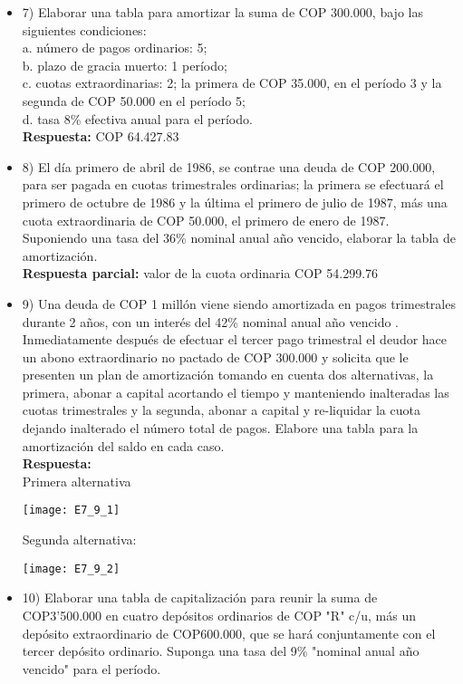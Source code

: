 \begin{itemize}
 \item 7)	Elaborar una tabla para amortizar la suma de COP 300.000, bajo las siguientes condiciones:\\
       a.	número de pagos ordinarios: 5;\\
       b.	plazo de gracia muerto: 1 período;\\
       c.	cuotas extraordinarias: 2; la primera de COP 35.000, en el período 3 y la segunda de COP 50.000 en el período 5;\\
       d.	tasa 8\% efectiva anual para el período.\\
       \textbf{Respuesta:} COP 64.427.83
       \medskip

 \item 8)	El día primero de abril de 1986, se contrae una deuda de COP 200.000, para ser pagada en cuotas trimestrales ordinarias; la primera se efectuará el primero de octubre de 1986 y la última el primero de julio de 1987, más una cuota extraordinaria de COP 50.000, el primero de enero de 1987. Suponiendo una tasa del 36\% nominal anual año vencido, elaborar la tabla de amortización.\\
       \textbf{Respuesta parcial:} valor de la cuota ordinaria COP 54.299.76
       \medskip

 \item 9)	Una deuda de COP 1 millón viene siendo amortizada en pagos trimestrales durante 2 años, con un interés del 42\% nominal anual año vencido . Inmediatamente después de efectuar el tercer pago trimestral el deudor hace un abono extraordinario no pactado de COP 300.000 y solicita que le presenten un plan de amortización tomando en cuenta dos alternativas, la primera, abonar a capital acortando el tiempo y manteniendo inalteradas las cuotas trimestrales y la segunda, abonar a capital y re-liquidar la cuota dejando inalterado el número total de pagos. Elabore una tabla para la amortización del saldo en cada caso.\\
       \textbf{Respuesta:}\\
       Primera alternativa
       \begin{center}
        \texttt{[image: E7\_9\_1]}
       \end{center}
       Segunda alternativa:
       \begin{center}
        \texttt{[image: E7\_9\_2]}
       \end{center}
       \medskip

 \item 10)	 Elaborar una tabla de capitalización para reunir la suma de COP3'500.000 en cuatro depósitos ordinarios de  COP  "R" c/u, más un depósito extraordinario de COP600.000, que se hará conjuntamente con el tercer depósito ordinario. Suponga una tasa del 9\% "nominal anual año vencido" para el período.\\
       \medskip


\end{itemize}
